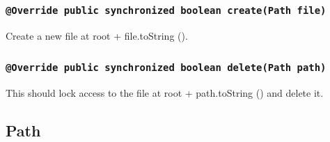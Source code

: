 \documentclass [10pt, a4paper]{article}
\begin{document}
\subsubsection{\texttt{@Override public synchronized boolean create(Path file)}}
Create a new file at root + file.toString ().

\subsubsection{\texttt{@Override public synchronized boolean delete(Path path)}}
This should lock access to the file at root + path.toString () and delete it.

\subsection {Path}
\end{document}
